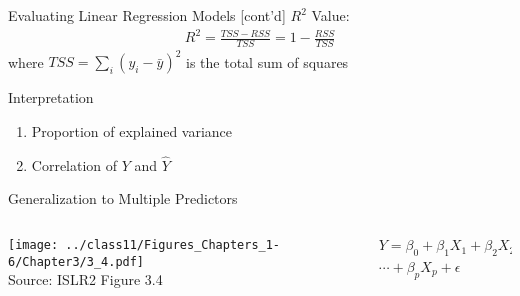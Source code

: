 \documentclass[ignorenonframetext,xcolor=x11names]{beamer}
\begin{document}
\begin{frame}{Evaluating Linear Regression Models \small [cont'd]}
$R^2$ Value:
\begin{align*}
R^2 = \frac{TSS - RSS}{TSS} = 1 - \frac{RSS}{TSS}
\end{align*}
where $TSS = \sum_i(y_i - \bar{y})^2$ is the total sum of squares
\begin{block}{Interpretation}
\begin{enumerate}
  \item Proportion of explained variance
  \item Correlation of $Y$ and $\hat{Y}$
\end{enumerate}
\end{block}

\end{frame}

\begin{frame}{Generalization to Multiple Predictors}
\begin{columns}
\begin{column}{0.65\textwidth}
\texttt{[image: ../class11/Figures\_Chapters\_1-6/Chapter3/3\_4.pdf]}  \\
\scriptsize Source: ISLR2 Figure 3.4
\end{column}
\begin{column}{0.35\textwidth}
\begin{multline*}
Y = \beta_0 + \beta_1 X_1 + \beta_2 X_2 + \\
\cdots + \beta_p X_p + \epsilon
\end{multline*}
\end{column}
\end{columns}
\end{frame}
\end{document}
